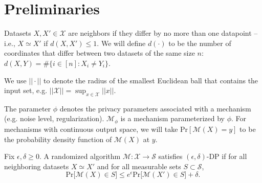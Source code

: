 \section{Preliminaries}
\label{sec:preliminaries}
Datasets $X, X' \in \mathcal{X}$ are neighbors if they differ by no more than one datapoint -- i.e., $X \simeq X'$ if $d(X, X') \leq 1$. We will define $d(\cdot)$ to be the number of coordinates that differ between two datasets of the same size $n$: $d(X, Y) = \#\{i \in [n]: X_i \neq Y_i  \}$.

We use $||\cdot||$ to denote the radius of the smallest Euclidean ball that contains the input set, e.g. $||\mathcal{X}|| = \sup_{x \in \mathcal{X}} ||x||$.

The parameter $\phi$ denotes the privacy parameters associated with a mechanism (e.g. noise level, regularization). $\mathcal{M}_{\phi}$ is a mechanism parameterized by $\phi$.
For mechanisms with continuous output space, we will take $\text{Pr}[\mathcal{M}(X) = y]$ to be the probability density function of $\mathcal{M}(X)$ at $y$.



    \begin{definition} \label{def:dp}
        Fix $\epsilon, \delta \geq 0$. 
A randomized algorithm $\mathcal{M}: \mathcal{X} \rightarrow \mathcal{S}$ satisfies $(\epsilon, \delta)$-DP if for all neighboring datasets $X \simeq X'$ and for all measurable sets $S \subset \mathcal{S}$, 
            \[\text{Pr}\big[\mathcal{M}(X) \in S\big] \leq e^{\epsilon}\text{Pr}\big[\mathcal{M}(X') \in S\big] + \delta.\]
    \end{definition}


